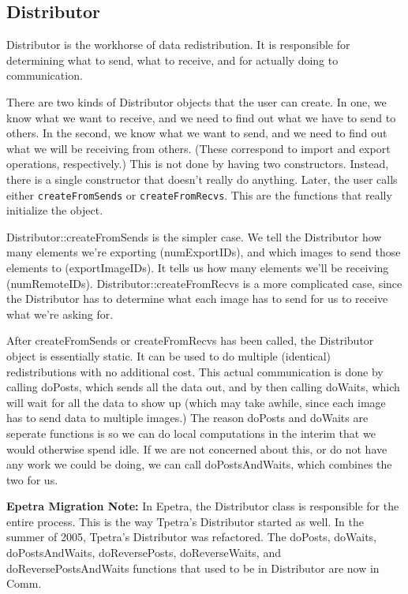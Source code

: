 \documentclass[10pt,relax]{TpetraDesign}
\begin{document}
\subsection{Distributor}

Distributor is the workhorse of data redistribution. It is responsible for determining what to send, what to receive, and for actually doing to communication.

There are two kinds of Distributor objects that the user can create. In one, we know what we want to receive, and we need to find out what we have to send to others. In the second, we know what we want to send, and we need to find out what we will be receiving from others. (These correspond to import and export operations, respectively.) This is not done by having two constructors. Instead, there is a single constructor that doesn't really do anything. Later, the user calls either \texttt{createFromSends} or \texttt{createFromRecvs}. This are the functions that really initialize the object.

Distributor::createFromSends is the simpler case. We tell the Distributor how many elements we're exporting (numExportIDs), and which images to send those elements to (exportImageIDs). It tells us how many elements we'll be receiving (numRemoteIDs). Distributor::createFromRecvs is a more complicated case, since the Distributor has to determine what each image has to send for us to receive what we're asking for.

After createFromSends or createFromRecvs has been called, the Distributor object is essentially static. It can be used to do multiple (identical) redistributions with no additional cost. This actual communication is done by calling doPosts, which sends all the data out, and by then calling doWaits, which will wait for all the data to show up (which may take awhile, since each image has to send data to multiple images.) The reason doPosts and doWaits are seperate functions is so we can do local computations in the interim that we would otherwise spend idle. If we are not concerned about this, or do not have any work we could be doing, we can call doPostsAndWaits, which combines the two for us.

\textbf{Epetra Migration Note:} In Epetra, the Distributor class is responsible for the entire process. This is the way Tpetra's Distributor started as well. In the summer of 2005, Tpetra's Distributor was refactored. The doPosts, doWaits, doPostsAndWaits, doReversePosts, doReverseWaits, and doReversePostsAndWaits functions that used to be in Distributor are now in Comm. 
\end{document}
